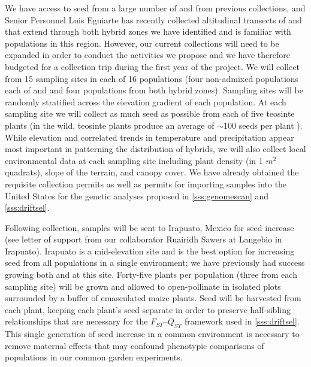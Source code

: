 We have access to seed from a large number of \zm{} and \zp{} from previous collections, and Senior Personnel Luis Eguiarte has recently collected altitudinal transects of \zp{} and \zm{} that extend through both hybrid zones we have identified \citep{Diez2013} and is familiar with populations in this region.
However, our current collections will need to be expanded in order to conduct the activities we propose and we have therefore budgeted for a collection trip during the first year of the project.
We will collect from 15 sampling sites in each of 16 populations (four non-admixed populations each of \zp{} and \zm{} and four populations from both hybrid zones).
Sampling sites will be randomly stratified across the elevation gradient of each population.
At each sampling site we will collect as much seed as possible from each of five teosinte plants (in the wild, teosinte plants produce an average of $\sim$100 seeds per plant \citep{wilkes1967teosinte}). 
While elevation and correlated trends in temperature and precipitation appear most important in patterning the distribution of hybrids, we will also collect local environmental data at each sampling site including plant density (in 1 $m^2$ quadrats), slope of the terrain, and canopy cover.  
We have already obtained the requisite collection permits as well as permits for importing samples into the United States for the genetic analyses proposed in \ref{sss:genomescan} and \ref{sss:driftsel}.

Following collection, samples will be sent to Irapuato, Mexico for seed increase (see letter of support from our collaborator Ruairidh Sawers at Langebio in Irapuato).
Irapuato is a mid-elevation site and is the best option for increasing seed from all populations in a single environment; we have previously had success growing both \zp{} and \zm{} at this site.
Forty-five plants per population (three from each sampling site) will be grown and allowed to open-pollinate in isolated plots surrounded by a buffer of emasculated maize plants.   
Seed will be harvested from each plant, keeping each plant's seed separate in order to preserve half-sibling relationships that are necessary for the $F_{ST}$--$Q_{ST}$ framework used in \ref{sss:driftsel}.
This single generation of seed increase in a common environment is necessary to remove maternal effects that may confound phenotypic comparisons of populations in our common garden experiments.

